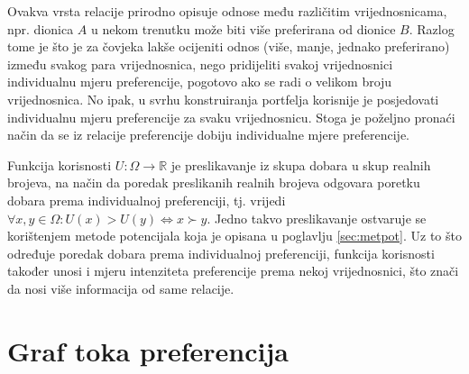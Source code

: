 \documentclass[lmodern, utf8, diplomski, numeric]{fer}
\begin{document}
  Ovakva vrsta relacije prirodno opisuje odnose među različitim vrijednosnicama, npr. dionica $A$ u nekom trenutku može biti više preferirana od dionice $B$.
  Razlog tome je što je za čovjeka lakše ocijeniti odnos (više, manje, jednako preferirano) između svakog para vrijednosnica, nego pridijeliti svakoj vrijednosnici individualnu mjeru preferencije, pogotovo ako se radi o velikom broju vrijednosnica.
  No ipak, u svrhu konstruiranja portfelja korisnije je posjedovati individualnu mjeru preferencije za svaku vrijednosnicu.
  Stoga je poželjno pronaći način da se iz relacije preferencije dobiju individualne mjere preferencije.
  
  Funkcija korisnosti  $U\colon \Omega \to \mathbb{R}$ je preslikavanje iz skupa dobara u skup realnih brojeva, na način da poredak preslikanih realnih brojeva odgovara poretku dobara prema individualnoj preferenciji, tj. vrijedi $\forall x, y \in \Omega \colon U(x) > U(y) \Leftrightarrow x \succ y$.
  Jedno takvo preslikavanje ostvaruje se korištenjem metode potencijala koja je opisana u poglavlju \ref{sec:metpot}.
  Uz to što određuje poredak dobara prema individualnoj preferenciji, funkcija korisnosti također unosi i mjeru intenziteta preferencije prema nekoj vrijednosnici, što znači da nosi više informacija od same relacije.

  \section{Graf toka preferencija}
  
\end{document}
